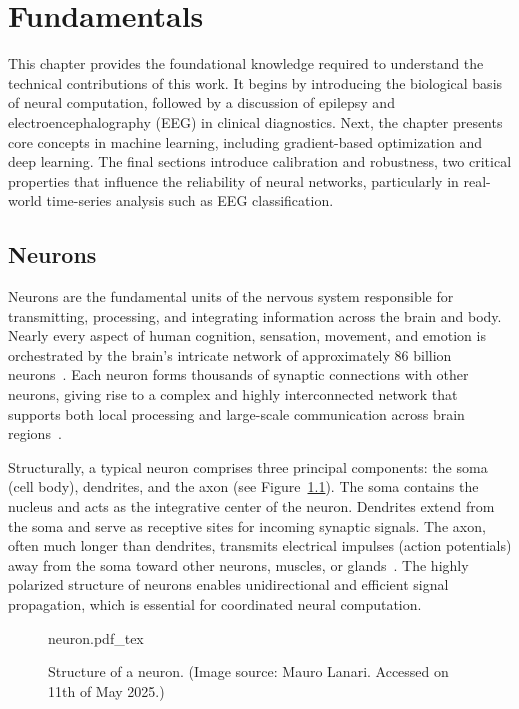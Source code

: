\chapter{Fundamentals}
\label{ch:background}
This chapter provides the foundational knowledge required to understand the technical contributions of this work. It begins by introducing the biological basis of neural computation, followed by a discussion of epilepsy and electroencephalography (EEG) in clinical diagnostics. Next, the chapter presents core concepts in machine learning, including gradient-based optimization and deep learning. The final sections introduce calibration and robustness, two critical properties that influence the reliability of neural networks, particularly in real-world time-series analysis such as EEG classification.

\section{Neurons}
Neurons are the fundamental units of the nervous system responsible for transmitting, processing, and integrating information across the brain and body. Nearly every aspect of human cognition, sensation, movement, and emotion is orchestrated by the brain’s intricate network of approximately 86 billion neurons~\cite{Lent2012}. Each neuron forms thousands of synaptic connections with other neurons, giving rise to a complex and highly interconnected network that supports both local processing and large-scale communication across brain regions~\cite{Kandel2013, Sporns2011}.

Structurally, a typical neuron comprises three principal components: the soma (cell body), dendrites, and the axon (see Figure~\ref{fig:neurons}). The soma contains the nucleus and acts as the integrative center of the neuron. Dendrites extend from the soma and serve as receptive sites for incoming synaptic signals. The axon, often much longer than dendrites, transmits electrical impulses (action potentials) away from the soma toward other neurons, muscles, or glands~\cite{Purves2018}. The highly polarized structure of neurons enables unidirectional and efficient signal propagation, which is essential for coordinated neural computation.

\begin{figure}[htb]
	\centering
    \def\svgwidth{350pt}
 	{neuron.pdf_tex} 	 	
	\caption[Structure of a neuron]{Structure of a neuron. (Image source: Mauro Lanari\footnotemark. Accessed on 11th of May 2025.)}
	\label{fig:neurons}
\end{figure}

